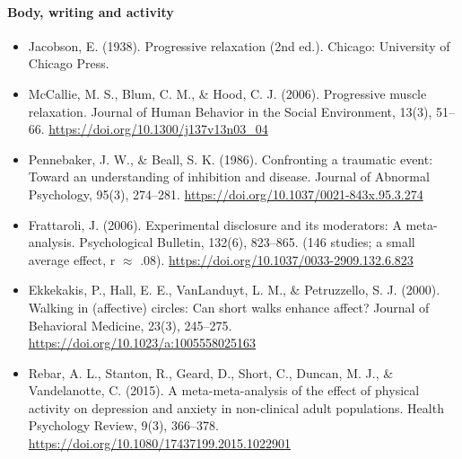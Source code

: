 \documentclass[10pt]{article}
\theoremstyle{remark}
\begin{document}
\paragraph{Body, writing and activity}
\begin{itemize}[leftmargin=1em,itemsep=0pt,topsep=1pt,parsep=0pt]
\item Jacobson, E. (1938). Progressive relaxation (2nd ed.). Chicago: University of Chicago Press.
\item McCallie, M. S., Blum, C. M., \& Hood, C. J. (2006). Progressive muscle relaxation. Journal of Human Behavior in the Social Environment, 13(3), 51--66. \url{https://doi.org/10.1300/j137v13n03_04}
\item Pennebaker, J. W., \& Beall, S. K. (1986). Confronting a traumatic event: Toward an understanding of inhibition and disease. Journal of Abnormal Psychology, 95(3), 274--281. \url{https://doi.org/10.1037/0021-843x.95.3.274}
\item Frattaroli, J. (2006). Experimental disclosure and its moderators: A meta-analysis. Psychological Bulletin, 132(6), 823--865. (146 studies; a small average effect, r $\approx$ .08). \url{https://doi.org/10.1037/0033-2909.132.6.823}
\item Ekkekakis, P., Hall, E. E., VanLanduyt, L. M., \& Petruzzello, S. J. (2000). Walking in (affective) circles: Can short walks enhance affect? Journal of Behavioral Medicine, 23(3), 245--275. \url{https://doi.org/10.1023/a:1005558025163}
\item Rebar, A. L., Stanton, R., Geard, D., Short, C., Duncan, M. J., \& Vandelanotte, C. (2015). A meta-meta-analysis of the effect of physical activity on depression and anxiety in non-clinical adult populations. Health Psychology Review, 9(3), 366--378. \url{https://doi.org/10.1080/17437199.2015.1022901}
\end{itemize}
\end{document}
